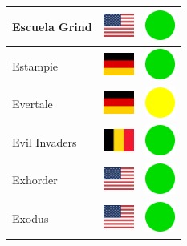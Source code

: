 \documentclass[12pt, a4paper, twoside]{report}
\begin{document}
\begin{center}
\begin{longtable}{|p{5cm}|p{2cm}|p{2cm}|}
Escuela Grind & \includegraphics[width=1cm]{4x3/us} & \includegraphics[width=1cm]{likes/y} \\ \hline
Estampie & \includegraphics[width=1cm]{4x3/de} & \includegraphics[width=1cm]{likes/y} \\ \hline
Evertale & \includegraphics[width=1cm]{4x3/de} & \includegraphics[width=1cm]{likes/m} \\ \hline
Evil Invaders & \includegraphics[width=1cm]{4x3/be} & \includegraphics[width=1cm]{likes/y} \\ \hline
Exhorder & \includegraphics[width=1cm]{4x3/us} & \includegraphics[width=1cm]{likes/y} \\ \hline
Exodus & \includegraphics[width=1cm]{4x3/us} & \includegraphics[width=1cm]{likes/y} \\ \hline

\end{longtable}
\end{center}
\end{document}

